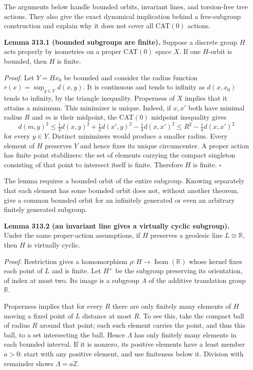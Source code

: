\documentclass[11pt]{article}
\begin{document}
The arguments below handle bounded orbits, invariant lines, and torsion-free tree actions. They also give the exact dynamical implication behind a free-subgroup construction and explain why it does not cover all CAT$(0)$ actions.

\textbf{Lemma 313.1 (bounded subgroups are finite).} Suppose a discrete group $H$ acts properly by isometries on a proper CAT$(0)$ space $X$. If one $H$-orbit is bounded, then $H$ is finite.

\emph{Proof.} Let $Y=Hx_0$ be bounded and consider the radius function $r(x)=\sup_{y\in Y}d(x,y)$. It is continuous and tends to infinity as $d(x,x_0)$ tends to infinity, by the triangle inequality. Properness of $X$ implies that it attains a minimum. This minimizer is unique. Indeed, if $x,x'$ both have minimal radius $R$ and $m$ is their midpoint, the CAT$(0)$ midpoint inequality gives
\[
 d(m,y)^2\leq\tfrac12d(x,y)^2+\tfrac12d(x',y)^2
                   -\tfrac14d(x,x')^2
 \leq R^2-\tfrac14d(x,x')^2
\]
for every $y\in Y$. Distinct minimizers would produce a smaller radius. Every element of $H$ preserves $Y$ and hence fixes its unique circumcenter. A proper action has finite point stabilizers: the set of elements carrying the compact singleton consisting of that point to intersect itself is finite. Therefore $H$ is finite. $\square$

The lemma requires a bounded orbit of the entire subgroup. Knowing separately that each element has some bounded orbit does not, without another theorem, give a common bounded orbit for an infinitely generated or even an arbitrary finitely generated subgroup.

\textbf{Lemma 313.2 (an invariant line gives a virtually cyclic subgroup).} Under the same proper-action assumptions, if $H$ preserves a geodesic line $L\cong\mathbb R$, then $H$ is virtually cyclic.

\emph{Proof.} Restriction gives a homomorphism $\rho:H\to\operatorname{Isom}(\mathbb R)$ whose kernel fixes each point of $L$ and is finite. Let $H^+$ be the subgroup preserving its orientation, of index at most two. Its image is a subgroup $\Lambda$ of the additive translation group $\mathbb R$.

Properness implies that for every $R$ there are only finitely many elements of $H$ moving a fixed point of $L$ distance at most $R$. To see this, take the compact ball of radius $R$ around that point; each such element carries the point, and thus this ball, to a set intersecting the ball. Hence $\Lambda$ has only finitely many elements in each bounded interval. If it is nonzero, its positive elements have a least member $a>0$: start with any positive element, and use finiteness below it. Division with remainder shows $\Lambda=a\mathbb Z$.
\end{document}

